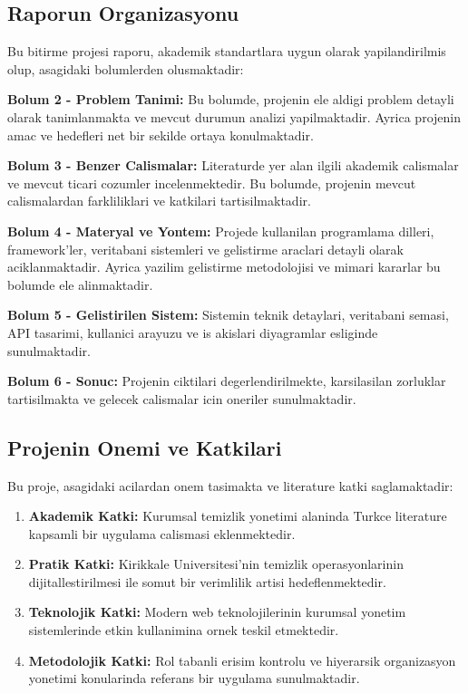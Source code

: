 \subsection{Raporun Organizasyonu}
\label{subsec:rapor-organizasyonu}

Bu bitirme projesi raporu, akademik standartlara uygun olarak 
yapilandirilmis olup, asagidaki bolumlerden olusmaktadir:

\textbf{Bolum 2 - Problem Tanimi:} Bu bolumde, projenin ele aldigi 
problem detayli olarak tanimlanmakta ve mevcut durumun analizi 
yapilmaktadir. Ayrica projenin amac ve hedefleri net bir sekilde 
ortaya konulmaktadir.

\textbf{Bolum 3 - Benzer Calismalar:} Literaturde yer alan ilgili 
akademik calismalar ve mevcut ticari cozumler incelenmektedir. 
Bu bolumde, projenin mevcut calismalardan farkliliklari ve 
katkilari tartisilmaktadir.

\textbf{Bolum 4 - Materyal ve Yontem:} Projede kullanilan 
programlama dilleri, framework'ler, veritabani sistemleri ve 
gelistirme araclari detayli olarak aciklanmaktadir. Ayrica 
yazilim gelistirme metodolojisi ve mimari kararlar bu bolumde 
ele alinmaktadir.

\textbf{Bolum 5 - Gelistirilen Sistem:} Sistemin teknik detaylari, 
veritabani semasi, API tasarimi, kullanici arayuzu ve is akislari 
diyagramlar esliginde sunulmaktadir.

\textbf{Bolum 6 - Sonuc:} Projenin ciktilari degerlendirilmekte, 
karsilasilan zorluklar tartisilmakta ve gelecek calismalar icin 
oneriler sunulmaktadir.

\subsection{Projenin Onemi ve Katkilari}
\label{subsec:proje-onemi}

Bu proje, asagidaki acilardan onem tasimakta ve literature katki 
saglamaktadir:

\begin{enumerate}
    \item \textbf{Akademik Katki:} Kurumsal temizlik yonetimi 
    alaninda Turkce literature kapsamli bir uygulama calismasi 
    eklenmektedir.
    
    \item \textbf{Pratik Katki:} Kirikkale Universitesi'nin temizlik 
    operasyonlarinin dijitallestirilmesi ile somut bir verimlilik 
    artisi hedeflenmektedir.
    
    \item \textbf{Teknolojik Katki:} Modern web teknolojilerinin 
    kurumsal yonetim sistemlerinde etkin kullanimina ornek 
    teskil etmektedir.
    
    \item \textbf{Metodolojik Katki:} Rol tabanli erisim kontrolu 
    ve hiyerarsik organizasyon yonetimi konularinda referans 
    bir uygulama sunulmaktadir.
\end{enumerate}

